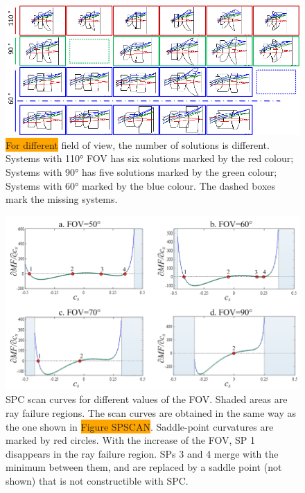 \begin{figure}[h!]
    \centering
    \includegraphics[width=1.0\textwidth]{chapter-3/figures/FOVvarying.png}
    \caption{\colorbox{orange}{For different} field of view, the number of solutions is different. Systems with 110° FOV has six solutions marked by the red colour; Systems with 90° has five solutions marked by the green colour; Systems with 60° marked by the blue colour. The dashed boxes mark the missing systems.}
    \label{fig:FOVvarying}
\end{figure}

\begin{figure}[h!]
    \centering
    \includegraphics[width=1.0\textwidth]{chapter-3/figures/PhaseTransition_field.png}
    \caption{SPC scan curves for different values of the FOV. Shaded areas are ray failure regions. The scan curves are obtained in the same way as the one shown in \colorbox{orange}{Figure SPSCAN}. Saddle-point curvatures are marked by red circles. With the increase of the FOV, SP 1 disappears in the ray failure region. SPs 3 and 4 merge with the minimum between them, and are replaced by a saddle point (not shown) that is not constructible with SPC.}
    \label{fig:phasechange_field}
\end{figure}

